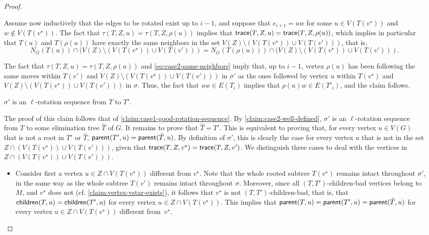 \documentclass[a4paper,UKenglish,cleveref, autoref, thm-restate]{lipics-v2021}
\newenvironment{cproof}{\proof[Proof of claim]\renewcommand\qedsymbol{$\diamond$}}{\endproof}
\newcommand{\parent}{{\sf parent}\xspace}
\newcommand{\child}{{\sf children}\xspace}
\newcommand{\trace}{{\sf trace}\xspace}
\begin{document}
\begin{proof}
\begin{cproof}
\begin{itemize}
      Assume now inductively that the edges to be rotated exist up to $i-1$,  and suppose that $e_{i+1}=uw$ for some $u \in V(T(v^{\star}))$ and $w \notin V(T(v^{\star}))$. The fact that $\tau(T,Z,u)=\tau(T,Z,\rho(u))$ implies that $\trace(T,Z,u)=\trace(T,Z,\rho(u))$, which implies in particular that $T(u)$ and $T(\rho(u))$ have exactly the same neighbors in the set $V(Z) \setminus (V(T(v^{\star})) \cup V(T(v')))$, that is,
  \begin{equation}\label{eq:case2-same-neighbors}
    N_G(T(u)) \cap  (V(Z) \setminus (V(T(v^{\star})) \cup V(T(v')))= N_G(T(\rho(u))) \cap  (V(Z) \setminus (V(T(v^{\star})) \cup V(T(v'))).
  \end{equation}

 The fact that $\tau(T,Z,u)=\tau(T,Z,\rho(u))$ and \autoref{eq:case2-same-neighbors} imply that, up to $i-1$, vertex  $\rho(u)$  has been following the same moves within $T(v')$ and $V(Z) \setminus (V(T(v^{\star})) \cup V(T(v')))$ in $\sigma'$ as the ones followed by vertex $u$ within $T(v^{\star})$ and $V(Z) \setminus (V(T(v^{\star})) \cup V(T(v')))$ in $\sigma$.
 Thus, the fact that $uw \in E(T_i)$ implies that $\rho(u)w \in E(T'_i)$, and the claim follows.
\end{itemize}
\vspace{-.05cm}
\end{cproof}


\begin{claim}\label{claim:case2-good-rotation-sequence}
$\sigma'$ is an $\ell$-rotation sequence from $T$ to $T'$.
\end{claim}
\begin{cproof}
The proof of this claim follows that of \autoref{claim:case1-good-rotation-sequence}. By \autoref{claim:case2-well-defined}, $\sigma'$ is an $\ell$-rotation sequence from $T$ to some elimination tree $\hat{T}$ of $G$. It remains to prove that $\hat{T}=T'$. This is equivalent to proving that, for every vertex $u \in V(G)$ that is not a root in $T'$ or $\hat{T}$, $\parent(T',u) = \parent(\hat{T},u)$. By definition of $\sigma'$, this is clearly the case for every vertex $u$ that is not in the set $Z \cap (V(T(v^{\star})) \cup  V(T(v')))$, given that $\trace(T,Z,v^{\star}) = \trace(T,Z,v')$. We distinguish three cases to deal with the vertices in $Z \cap (V( T(v^{\star})) \cup  V(T(v')))$.

\begin{itemize}
\item Consider first a vertex $u \in Z \cap V(T(v^{\star}))$ different from $v^{\star}$. Note that the whole rooted subtree $T(v^{\star})$ remains intact throughout $\sigma'$, in the same way as the whole subtree $T(v')$ remains intact throughout $\sigma$. Moreover, since all $(T,T')$-children-bad vertices belong to $M$, and $v^{\star}$ does not (cf. \autoref{claim:vertex-vstar-exists}), it follows that $v^{\star}$ is not $(T,T')$-children-bad, that is, that $\child(T,u)=\child(T',u)$ for every vertex $u \in Z \cap V(T(v^{\star}))$. This implies that $\parent(T,u) = \parent(T',u) = \parent(\hat{T},u)$ for every vertex $u \in Z \cap V(T(v^{\star}))$ different from~$v^{\star}$.



\end{itemize}
\end{cproof}
\end{proof}
\end{document}
